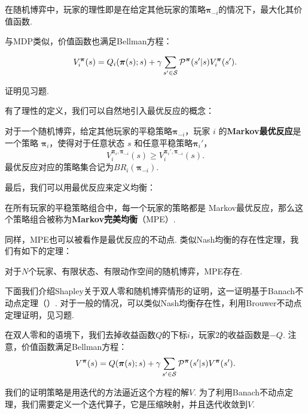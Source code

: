在随机博弈中，玩家的理性即是在给定其他玩家的策略$\boldsymbol \pi_{-i}$的情况下，最大化其价值函数. 

与MDP类似，价值函数也满足Bellman方程：

\begin{theorem}[Bellman方程]
        \[V_i^{\boldsymbol \pi}(s) = Q_i(\boldsymbol \pi(s);s) + \gamma \sum_{s'\in \mathcal S} \mathcal P^{\boldsymbol\pi}(s'|s)V_i^{\boldsymbol \pi}(s').\]
\end{theorem}
证明见习题.

有了理性的定义，我们可以自然地引入最优反应的概念：

\begin{definition}[Markov最优反应]
    对于一个随机博弈，给定其他玩家的平稳策略$\boldsymbol \pi_{-i}$，玩家 $i$ 的\textbf{Markov最优反应}是一个策略 $\boldsymbol \pi_i$，使得对于任意状态 $s$ 和任意平稳策略$\boldsymbol \pi_i'$，
    \[V_i^{\boldsymbol \pi_i,\boldsymbol \pi_{-i}}(s)\geq V_i^{\boldsymbol \pi_i',\boldsymbol \pi_{-i}}(s).\]
    最优反应对应的策略集合记为$BR_i(\boldsymbol \pi_{-i})$.
\end{definition}

最后，我们可以用最优反应来定义均衡：

\begin{definition}
    在所有玩家的平稳策略组合中，每一个玩家的策略都是 Markov最优反应，那么这个策略组合被称为\textbf{Markov完美均衡}（MPE）.
\end{definition}

同样，MPE也可以被看作是最优反应的不动点. 类似Nash均衡的存在性定理，我们有如下的定理：

\begin{theorem}
对于$N$个玩家、有限状态、有限动作空间的随机博弈，MPE存在.
\end{theorem}

下面我们介绍Shapley关于双人零和随机博弈情形的证明，这一证明基于Banach不动点定理（）. 对于一般的情况，可以类似Nash均衡存在性，利用Brouwer不动点定理证明，见习题.

在双人零和的语境下，我们去掉收益函数$Q$的下标$i$，玩家$2$的收益函数是$-Q$. 注意，价值函数满足Bellman方程：
    \[V^{\boldsymbol \pi}(s) = Q(\boldsymbol \pi(s);s) + \gamma \sum_{s'\in \mathcal S} \mathcal P^{\boldsymbol\pi}(s'|s)V^{\boldsymbol \pi}(s').\]

我们的证明策略是用迭代的方法逼近这个方程的解$V$. 为了利用Banach不动点定理，我们需要定义一个迭代算子，它是压缩映射，并且迭代收敛到$V$. 

